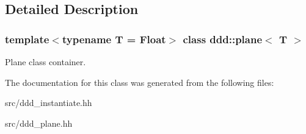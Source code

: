 \subsection{Detailed Description}
\subsubsection*{template$<$typename T = Float$>$\newline
class ddd\+::plane$<$ T $>$}

Plane class container. 

The documentation for this class was generated from the following files\+:\begin{DoxyCompactItemize}
\item 
src/ddd\+\_\+instantiate.\+hh\item 
src/ddd\+\_\+plane.\+hh\end{DoxyCompactItemize}

